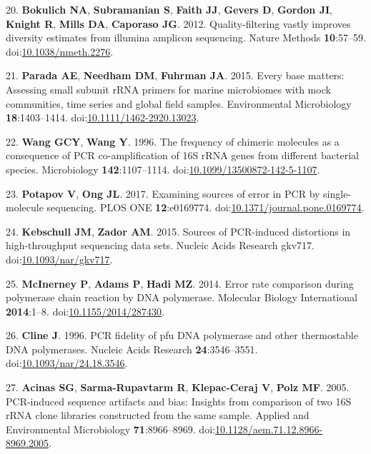 \documentclass[11pt,]{article}
\begin{document}
\leavevmode\hypertarget{ref-Bokulich2012}{}%
20. \textbf{Bokulich NA}, \textbf{Subramanian S}, \textbf{Faith JJ},
\textbf{Gevers D}, \textbf{Gordon JI}, \textbf{Knight R}, \textbf{Mills
DA}, \textbf{Caporaso JG}. 2012. Quality-filtering vastly improves
diversity estimates from illumina amplicon sequencing. Nature Methods
\textbf{10}:57--59.
doi:\href{https://doi.org/10.1038/nmeth.2276}{10.1038/nmeth.2276}.

\leavevmode\hypertarget{ref-Parada2015}{}%
21. \textbf{Parada AE}, \textbf{Needham DM}, \textbf{Fuhrman JA}. 2015.
Every base matters: Assessing small subunit rRNA primers for marine
microbiomes with mock communities, time series and global field samples.
Environmental Microbiology \textbf{18}:1403--1414.
doi:\href{https://doi.org/10.1111/1462-2920.13023}{10.1111/1462-2920.13023}.

\leavevmode\hypertarget{ref-Wang1996}{}%
22. \textbf{Wang GCY}, \textbf{Wang Y}. 1996. The frequency of chimeric
molecules as a consequence of PCR co-amplification of 16S rRNA genes
from different bacterial species. Microbiology \textbf{142}:1107--1114.
doi:\href{https://doi.org/10.1099/13500872-142-5-1107}{10.1099/13500872-142-5-1107}.

\leavevmode\hypertarget{ref-Potapov2017}{}%
23. \textbf{Potapov V}, \textbf{Ong JL}. 2017. Examining sources of
error in PCR by single-molecule sequencing. PLOS ONE
\textbf{12}:e0169774.
doi:\href{https://doi.org/10.1371/journal.pone.0169774}{10.1371/journal.pone.0169774}.

\leavevmode\hypertarget{ref-Kebschull2015}{}%
24. \textbf{Kebschull JM}, \textbf{Zador AM}. 2015. Sources of
PCR-induced distortions in high-throughput sequencing data sets. Nucleic
Acids Research gkv717.
doi:\href{https://doi.org/10.1093/nar/gkv717}{10.1093/nar/gkv717}.

\leavevmode\hypertarget{ref-McInerney2014}{}%
25. \textbf{McInerney P}, \textbf{Adams P}, \textbf{Hadi MZ}. 2014.
Error rate comparison during polymerase chain reaction by DNA
polymerase. Molecular Biology International \textbf{2014}:1--8.
doi:\href{https://doi.org/10.1155/2014/287430}{10.1155/2014/287430}.

\leavevmode\hypertarget{ref-Cline1996}{}%
26. \textbf{Cline J}. 1996. PCR fidelity of pfu DNA polymerase and other
thermostable DNA polymerases. Nucleic Acids Research
\textbf{24}:3546--3551.
doi:\href{https://doi.org/10.1093/nar/24.18.3546}{10.1093/nar/24.18.3546}.

\leavevmode\hypertarget{ref-Acinas2005}{}%
27. \textbf{Acinas SG}, \textbf{Sarma-Rupavtarm R}, \textbf{Klepac-Ceraj
V}, \textbf{Polz MF}. 2005. PCR-induced sequence artifacts and bias:
Insights from comparison of two 16S rRNA clone libraries constructed
from the same sample. Applied and Environmental Microbiology
\textbf{71}:8966--8969.
doi:\href{https://doi.org/10.1128/aem.71.12.8966-8969.2005}{10.1128/aem.71.12.8966-8969.2005}.
\end{document}
